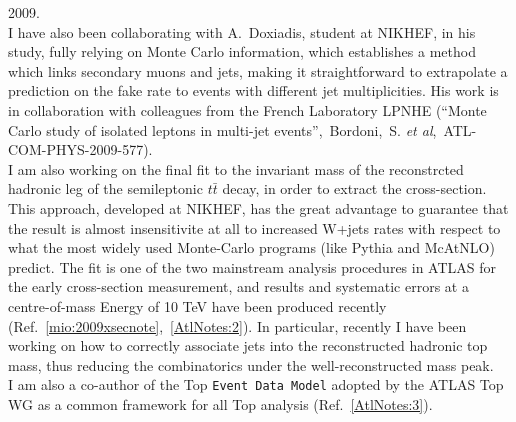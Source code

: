 \documentclass{article}
\begin{document}
\begin{vita}
2009. \\
I have also been collaborating with A.~Doxiadis, student at NIKHEF, in his study, 
fully relying on Monte Carlo information, which establishes a method which links secondary muons and jets, 
making it straightforward to extrapolate a prediction on the fake rate to events with different jet multiplicities. 
His work is in collaboration with colleagues from the French Laboratory LPNHE (``Monte Carlo study of isolated
leptons in multi-jet events'',~Bordoni,~S. {\it et al},~ATL-COM-PHYS-2009-577).\\
I am also working on the final fit to the invariant mass of the
reconstrcted hadronic leg of the
semileptonic $t\bar{t}$ decay, in order to extract the cross-section. This
approach, developed at NIKHEF, has the great advantage to guarantee
that the result is almost 
insensitivite at all to increased W+jets rates with respect to what 
the most widely used Monte-Carlo programs (like Pythia and
McAtNLO) predict. The fit is one of the two mainstream analysis procedures in ATLAS 
for the early cross-section measurement, and results and systematic errors at a centre-of-mass
Energy of 10 TeV have been produced recently (Ref.~\ref{mio:2009xsecnote},~\ref{AtlNotes:2}). In
particular, recently I have been working on how to correctly associate
jets into the reconstructed hadronic top mass, thus reducing the combinatorics
 under the well-reconstructed mass peak. \\
I am also a co-author of the Top {\tt Event Data Model} adopted by the
ATLAS Top WG as a common framework for all Top analysis (Ref.~\ref{AtlNotes:3}).\\


\end{vita}
\end{document}
